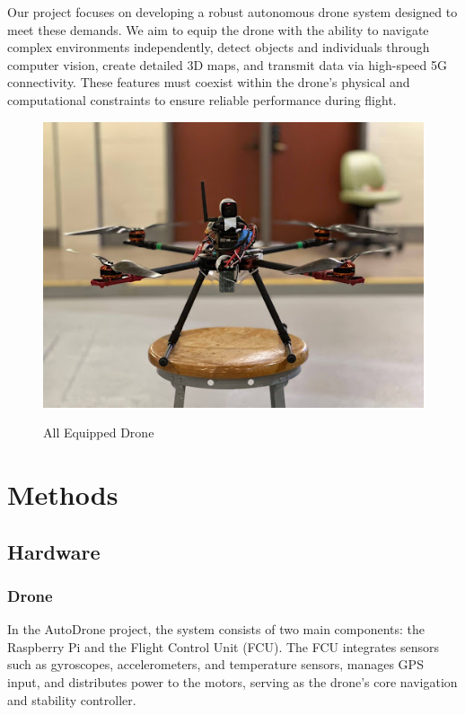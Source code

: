 \documentclass[conference]{IEEEtran}
\begin{document}
Our project focuses on developing a robust autonomous drone system designed to meet these demands. We aim to equip the drone with the ability to navigate complex environments independently, detect objects and individuals through computer vision, create detailed 3D maps, and transmit data via high-speed 5G connectivity. These features must coexist within the drone's physical and computational constraints to ensure reliable performance during flight.


\begin{figure}[h]
    \centering
    {\includegraphics[scale=0.35]{figures/Drone.jpg}}
    \caption{All Equipped Drone}
    \label{Stepper Motor}
\end{figure}


\section{Methods}

\subsection{Hardware}

\subsubsection{Drone}

In the AutoDrone project, the system consists of two main components: the Raspberry Pi and the Flight Control Unit (FCU). The FCU integrates sensors such as gyroscopes, accelerometers, and temperature sensors, manages GPS input, and distributes power to the motors, serving as the drone's core navigation and stability controller.
\end{document}
